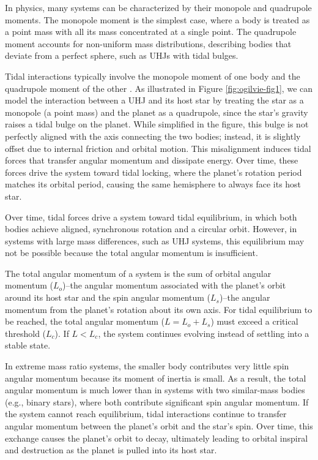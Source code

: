 \documentclass[oneside,12pt]{amsart}
\numberwithin{page}{section}
\begin{document}
In physics, many systems can be characterized by their monopole and quadrupole moments. The monopole moment is the simplest case, where a body is treated as a point mass with all its mass concentrated at a single point. The quadrupole moment accounts for non-uniform mass distributions, describing bodies that deviate from a perfect sphere, such as UHJs with tidal bulges.

Tidal interactions typically involve the monopole moment of one body and the quadrupole moment of the other \citep{ogilvie2014tidal}. As illustrated in Figure \ref{fig:ogilvie-fig1}, we can model the interaction between a UHJ and its host star by treating the star as a monopole (a point mass) and the planet as a quadrupole, since the star’s gravity raises a tidal bulge on the planet. While simplified in the figure, this bulge is not perfectly aligned with the axis connecting the two bodies; instead, it is slightly offset due to internal friction and orbital motion. This misalignment induces tidal forces that transfer angular momentum and dissipate energy. Over time, these forces drive the system toward tidal locking, where the planet’s rotation period matches its orbital period, causing the same hemisphere to always face its host star.

Over time, tidal forces drive a system toward tidal equilibrium, in which both bodies achieve aligned, synchronous rotation and a circular orbit. However, in systems with large mass differences, such as UHJ systems, this equilibrium may not be possible because the total angular momentum is insufficient.

The total angular momentum of a system is the sum of orbital angular momentum ($L_o$)–the angular momentum associated with the planet's orbit around its host star and the spin angular momentum ($L_s$)–the angular momentum from the planet’s rotation about its own axis.
For tidal equilibrium to be reached, the total angular momentum ($L = L_o + L_s$) must exceed a critical threshold ($L_c$). If $L < L_c$, the system continues evolving instead of settling into a stable state.

In extreme mass ratio systems, the smaller body contributes very little spin angular momentum because its moment of inertia is small. As a result, the total angular momentum is much lower than in systems with two similar-mass bodies (e.g., binary stars), where both contribute significant spin angular momentum. If the system cannot reach equilibrium, tidal interactions continue to transfer angular momentum between the planet’s orbit and the star’s spin. Over time, this exchange causes the planet’s orbit to decay, ultimately leading to orbital inspiral and destruction as the planet is pulled into its host star.
\end{document}
